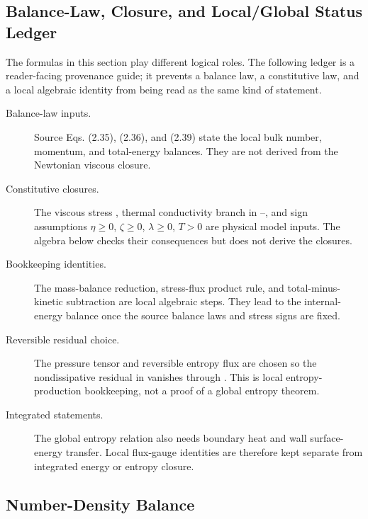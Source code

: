 \subsection{Balance-Law, Closure, and Local/Global Status Ledger}

The formulas in this section play different logical roles.  The following
ledger is a reader-facing provenance guide; it prevents a balance law, a
constitutive law, and a local algebraic identity from being read as the same
kind of statement.
\begin{description}
\item[Balance-law inputs.]  Source Eqs. (2.35), (2.36), and (2.39) state
  the local bulk number, momentum, and total-energy balances.  They are not
  derived from the Newtonian viscous closure.
\item[Constitutive closures.]  The viscous stress , thermal
  conductivity branch in --, and sign assumptions
  \(\eta\ge0\), \(\zeta\ge0\), \(\lambda\ge0\), \(T>0\) are physical model
  inputs.  The algebra below checks their consequences but does not derive the
  closures.
\item[Bookkeeping identities.]  The mass-balance reduction, stress-flux
  product rule, and total-minus-kinetic subtraction are local algebraic steps.
  They lead to the internal-energy balance  once the source
  balance laws and stress signs are fixed.
\item[Reversible residual choice.]  The pressure tensor and reversible entropy
  flux are chosen so the nondissipative residual in  vanishes
  through .  This is local entropy-production bookkeeping, not a
  proof of a global entropy theorem.
\item[Integrated statements.]  The global entropy relation  also
  needs boundary heat and wall surface-energy transfer.  Local flux-gauge
  identities are therefore kept separate from integrated energy or entropy
  closure.
\end{description}

\subsection{Number-Density Balance}


